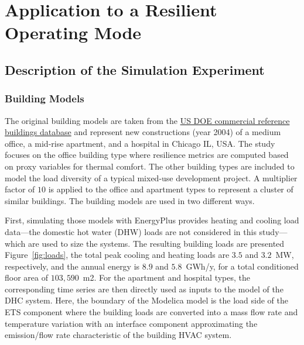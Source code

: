 \section{Application to a Resilient Operating Mode} \label{sec:application}

\subsection{Description of the Simulation Experiment} \label{sec:experiment}

\subsubsection{Building Models} \label{sec:buildings}

The original building models are taken from the \href{https://www.energy.gov/eere/buildings/commercial-reference-buildings}{US DOE commercial reference buildings database} and represent new constructions (year 2004) of a medium office, a mid-rise apartment, and a hospital in Chicago IL, USA.
The study focuses on the office building type where resilience metrics are computed based on proxy variables for thermal comfort. The other building types are included to model the load diversity of a typical mixed-use development project.
A multiplier factor of $10$ is applied to the office and apartment types to represent a cluster of similar buildings.
The building models are used in two different ways.

First, simulating those models with EnergyPlus provides heating and cooling load data---the domestic hot water (DHW) loads are not considered in this study---which are used to size the systems.
The resulting building loads are presented Figure~\ref{fig:loads}, the total peak cooling and heating loads are $3.5$ and $3.2$~MW, respectively, and the annual energy is $8.9$ and $5.8$~GWh/y, for a total conditioned floor area of $103,590$~m2.
For the apartment and hospital types, the corresponding time series are then directly used as inputs to the model of the DHC system.
Here, the boundary of the Modelica model is the load side of the ETS component where the building loads are converted into a mass flow rate and temperature variation with an interface component approximating the emission/flow rate characteristic of the building HVAC system.

